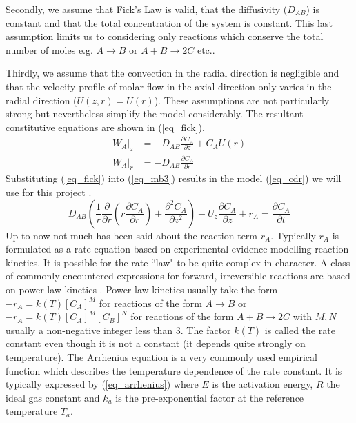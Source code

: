 \documentclass[11pt,fleqn]{article}
\theoremstyle{defstyle}
\begin{document}
Secondly, we assume that Fick's Law is valid, that the diffusivity ($D_{AB}$) is constant and that the total concentration of the system is constant. This last assumption limits us to considering only reactions which conserve the total number of moles e.g. $A \rightarrow B$ or $A + B \rightarrow 2C$ etc..

Thirdly, we assume that the convection in the radial direction is negligible and that the velocity profile of molar flow in the axial direction only varies in the radial direction ($U(z,r)=U(r)$). These assumptions are not particularly strong but nevertheless simplify the model considerably. The resultant constitutive equations are shown in (\ref{eq_fick}).  
\begin{equation}
\begin{aligned}
W_A|_z &= -D_{AB}\frac{\partial C_A}{\partial z} + C_A U(r) \\
W_A|_r &= -D_{AB}\frac{\partial C_A}{\partial r}  
\end{aligned}
\label{eq_fick}
\end{equation} 
Substituting (\ref{eq_fick}) into (\ref{eq_mb3}) results in the model (\ref{eq_cdr}) we will use for this project \cite{fogler}.
\begin{equation}
D_{AB}(\frac{1}{r}\frac{\partial}{\partial r}(r\frac{\partial C_A}{\partial r}) + \frac{\partial^2 C_A}{\partial z^2}) - U_z\frac{\partial C_A}{\partial z} + r_A = \frac{\partial C_A}{\partial t}
\label{eq_cdr}
\end{equation}
Up to now not much has been said about the reaction term $r_A$. Typically $r_A$ is formulated as a rate equation based on experimental evidence modelling reaction kinetics. It is possible for the rate ``law" to be quite complex in character. A class of commonly encountered expressions for forward, irreversible reactions are based on power law kinetics \cite{levenspiel}. Power law kinetics usually take the form $-r_A=k(T)[C_A]^M$ for reactions of the form $A \rightarrow B$ or $-r_A=k(T)[C_A]^M[C_B]^N$ for reactions of the form $A + B \rightarrow 2C$ with $M,N$ usually a non-negative integer less than 3. The factor $k(T)$ is called the rate constant even though it is not a constant (it depends quite strongly on temperature). The Arrhenius equation is a very commonly used empirical function which describes the temperature dependence of the rate constant. It is typically expressed by (\ref{eq_arrhenius}) where $E$ is the activation energy, $R$ the ideal gas constant and $k_a$ is the pre-exponential factor at the reference temperature $T_a$. 
\end{document}
